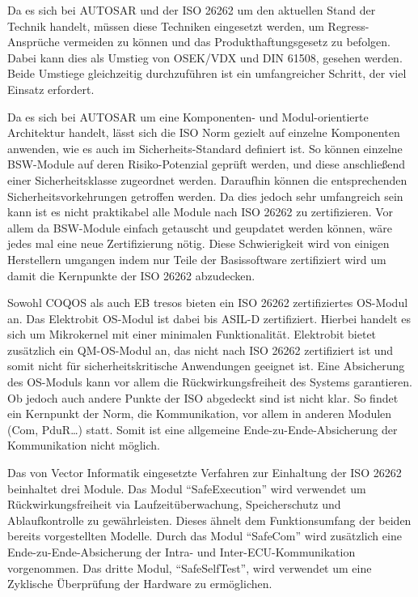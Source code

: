 \documentclass[
  a4paper,					    %
  twoside,
  DIV=calc,     				%
  bibliography=totoc,
  cleardoublepage=empty,
  ngerman,     					%
  final       					%
]{scrbook}
\begin{document}
Da es sich bei AUTOSAR und der ISO 26262 um den aktuellen Stand der Technik handelt, müssen diese Techniken eingesetzt werden, um Regress-Ansprüche vermeiden zu können und das Produkthaftungsgesetz zu befolgen. Dabei kann dies als Umstieg von OSEK/VDX und DIN 61508, gesehen werden. Beide Umstiege gleichzeitig durchzuführen ist ein umfangreicher Schritt, der viel Einsatz erfordert. 

Da es sich bei AUTOSAR um eine Komponenten- und Modul-orientierte Architektur handelt, lässt sich die ISO Norm gezielt auf einzelne Komponenten anwenden, wie es auch im Sicherheits-Standard definiert ist. So können einzelne BSW-Module auf deren Risiko-Potenzial geprüft werden, und diese anschließend einer Sicherheitsklasse zugeordnet werden. Daraufhin können die entsprechenden Sicherheitsvorkehrungen getroffen werden. Da dies jedoch sehr umfangreich sein kann ist es nicht praktikabel alle Module nach ISO 26262 zu zertifizieren. Vor allem da BSW-Module einfach getauscht und geupdatet werden können, wäre jedes mal eine neue Zertifizierung nötig. Diese Schwierigkeit wird von einigen Herstellern umgangen indem nur Teile der Basissoftware zertifiziert wird um damit die Kernpunkte der ISO 26262 abzudecken.

Sowohl COQOS als auch EB tresos bieten ein ISO 26262 zertifiziertes OS-Modul an.\cite{coqos}\cite{eb_tresos} Das Elektrobit OS-Modul ist dabei bis ASIL-D zertifiziert. Hierbei handelt es sich um Mikrokernel mit einer minimalen Funktionalität. Elektrobit bietet zusätzlich ein QM-OS-Modul an, das nicht nach ISO 26262 zertifiziert ist und somit nicht für sicherheitskritische Anwendungen geeignet ist. Eine Absicherung des OS-Moduls kann vor allem die Rückwirkungsfreiheit des Systems garantieren. Ob jedoch auch andere Punkte der ISO abgedeckt sind ist nicht klar. So findet ein Kernpunkt der Norm, die Kommunikation, vor allem in anderen Modulen (Com, PduR\dots) statt. Somit ist eine allgemeine Ende-zu-Ende-Absicherung der Kommunikation nicht möglich.

Das von Vector Informatik eingesetzte Verfahren zur Einhaltung der ISO 26262 beinhaltet drei Module.\cite{microsar} Das Modul "`SafeExecution"' wird verwendet um Rückwirkungsfreiheit via Laufzeitüberwachung, Speicherschutz und Ablaufkontrolle zu gewährleisten. Dieses ähnelt dem Funktionsumfang der beiden bereits vorgestellten Modelle. Durch das Modul "`SafeCom"' wird zusätzlich eine Ende-zu-Ende-Absicherung der Intra- und Inter-ECU-Kommunikation vorgenommen. Das dritte Modul, "`SafeSelfTest"', wird verwendet um eine Zyklische Überprüfung der Hardware zu ermöglichen.
\end{document}
